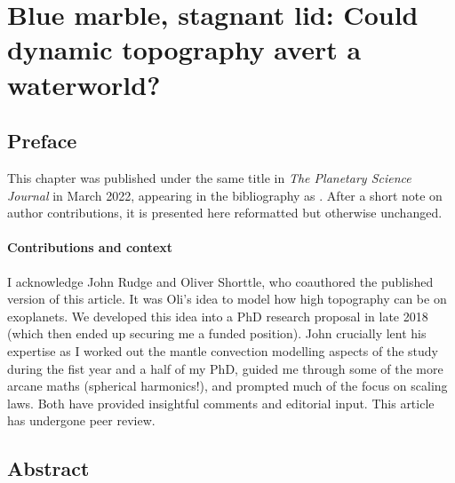 
\chapter{Blue marble, stagnant lid: Could dynamic topography avert a waterworld?}  %
\label{chapter:topography}

\ifpdf
    \graphicspath{{Chapter1/Figs/Raster/}{Chapter1/Figs/PDF/}{Chapter1/Figs/}}
\else
    \graphicspath{{Chapter1/Figs/Vector/}{Chapter1/Figs/}}
\fi

\section*{Preface}

This chapter was published under the same title in \textit{The Planetary Science Journal} in March 2022, appearing in the bibliography as \citet*{guimond_blue_2022}. After a short note on author contributions, it is presented here reformatted but otherwise unchanged. 


\subsubsection*{Contributions and context}

I acknowledge John Rudge and Oliver Shorttle, who coauthored the published version of this article. It was Oli's idea to model how high topography can be on exoplanets. We developed this idea into a PhD research proposal in late 2018 (which then ended up securing me a funded position). John crucially lent his expertise as I worked out the mantle convection modelling aspects of the study during the fist year and a half of my PhD, guided me through some of the more arcane maths (spherical harmonics!), and prompted much of the focus on scaling laws. Both have provided insightful comments and editorial input. This article has undergone peer review. %

\section*{Abstract}

